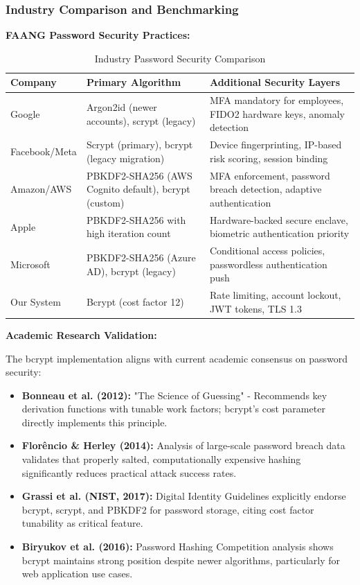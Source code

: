 \documentclass[12pt,a4paper]{article}
\begin{document}
\subsubsection{Industry Comparison and Benchmarking}

\textbf{FAANG Password Security Practices:}

\begin{table}[H]
\centering
\small
\begin{tabular}{|p{3cm}|p{5cm}|p{5cm}|}
\hline
\textbf{Company} & \textbf{Primary Algorithm} & \textbf{Additional Security Layers} \\
\hline
Google & Argon2id (newer accounts), scrypt (legacy) & MFA mandatory for employees, FIDO2 hardware keys, anomaly detection \\
\hline
Facebook/Meta & Scrypt (primary), bcrypt (legacy migration) & Device fingerprinting, IP-based risk scoring, session binding \\
\hline
Amazon/AWS & PBKDF2-SHA256 (AWS Cognito default), bcrypt (custom) & MFA enforcement, password breach detection, adaptive authentication \\
\hline
Apple & PBKDF2-SHA256 with high iteration count & Hardware-backed secure enclave, biometric authentication priority \\
\hline
Microsoft & PBKDF2-SHA256 (Azure AD), bcrypt (legacy) & Conditional access policies, passwordless authentication push \\
\hline
Our System & Bcrypt (cost factor 12) & Rate limiting, account lockout, JWT tokens, TLS 1.3 \\
\hline
\end{tabular}
\caption{Industry Password Security Comparison}
\end{table}

\vspace{0.5em}

\textbf{Academic Research Validation:}

The bcrypt implementation aligns with current academic consensus on password security:

\begin{itemize}[leftmargin=2em, itemsep=6pt]
    \item \textbf{Bonneau et al. (2012):} "The Science of Guessing" - Recommends key derivation functions with tunable work factors; bcrypt's cost parameter directly implements this principle.
    \item \textbf{Florêncio \& Herley (2014):} Analysis of large-scale password breach data validates that properly salted, computationally expensive hashing significantly reduces practical attack success rates.
    \item \textbf{Grassi et al. (NIST, 2017):} Digital Identity Guidelines explicitly endorse bcrypt, scrypt, and PBKDF2 for password storage, citing cost factor tunability as critical feature.
    \item \textbf{Biryukov et al. (2016):} Password Hashing Competition analysis shows bcrypt maintains strong position despite newer algorithms, particularly for web application use cases.
\end{itemize}
\end{document}

